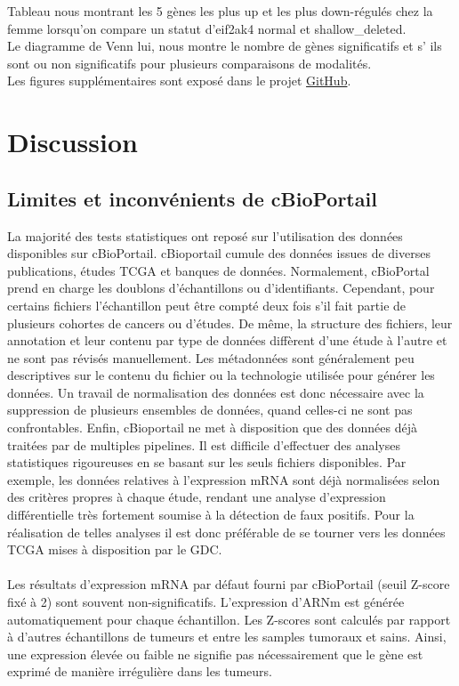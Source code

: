 \documentclass{style}
\begin{document}
Tableau nous montrant les 5 gènes les plus up et les plus down-régulés chez la femme lorsqu’on compare un statut d’eif2ak4 normal et shallow\_deleted. \\
Le diagramme de Venn lui, nous montre le nombre de gènes significatifs et s' ils sont ou non significatifs pour plusieurs comparaisons de modalités. \\

Les figures supplémentaires sont exposé dans le projet \href{https://github.com/BenDo85/EIF2AK4/tree/main/result}{GitHub}. \\

\newpage
\section{Discussion}
\subsection{Limites et inconvénients de cBioPortail}
La majorité des tests statistiques ont reposé sur l’utilisation des données disponibles sur cBioPortail. 
cBioportail cumule des données issues de diverses publications, études TCGA et banques de données. Normalement, cBioPortal prend en charge les doublons d’échantillons ou d’identifiants. Cependant, pour certains fichiers l'échantillon peut être compté deux fois s’il fait partie de plusieurs cohortes de cancers ou d’études. De même, la structure des fichiers, leur annotation et leur contenu par type de données diffèrent d’une étude à l’autre et ne sont pas révisés manuellement. Les métadonnées sont généralement peu descriptives sur le contenu du fichier ou la technologie utilisée pour générer les données. Un travail de normalisation des données est donc nécessaire avec la suppression de plusieurs ensembles de données, quand celles-ci ne sont pas confrontables. Enfin, cBioportail ne met à disposition que des données déjà traitées par de multiples pipelines. Il est difficile d’effectuer des analyses statistiques rigoureuses en se basant sur les seuls fichiers disponibles. Par exemple, les données relatives à l’expression mRNA sont déjà normalisées selon des critères propres à chaque étude, rendant une analyse d’expression différentielle très fortement soumise à la détection de faux positifs. Pour la réalisation de telles analyses il est donc préférable de se tourner vers les données TCGA mises à disposition par le GDC. \\ \\
Les résultats d’expression mRNA par défaut fourni par cBioPortail (seuil Z-score fixé à 2) sont souvent non-significatifs. L’expression d'ARNm est générée automatiquement pour chaque échantillon. Les Z-scores sont calculés par rapport à d'autres échantillons de tumeurs et entre les samples tumoraux et sains. Ainsi, une expression élevée ou faible ne signifie pas nécessairement que le gène est exprimé de manière irrégulière dans les tumeurs. \\ \\
\end{document}
